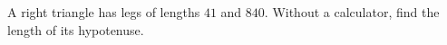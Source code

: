 A right triangle has legs of lengths $41$ and $840$. Without a calculator, find the length of its hypotenuse.
